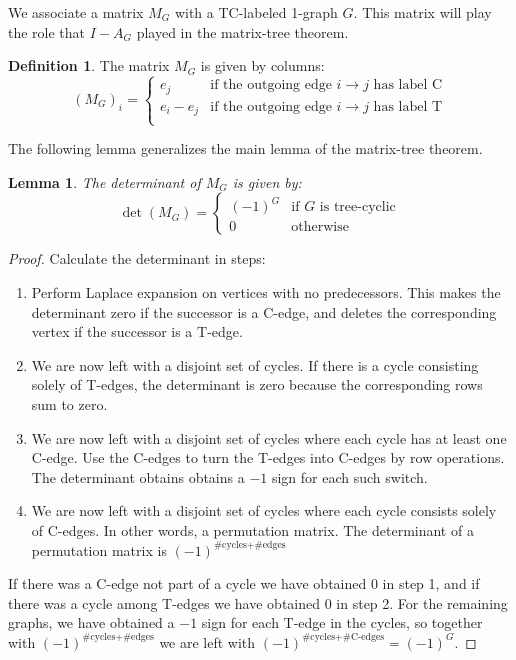 \documentclass[a4paper, 11pt]{article}
\newtheorem{lemma}[theorem]{Lemma}
\theoremstyle{definition}
\newtheorem{definition}{Definition}[section]
\begin{document}
We associate a matrix $M_G$ with a TC-labeled 1-graph $G$. This matrix will play the role that $I - A_G$ played in the matrix-tree theorem.

\begin{definition}
  The matrix $M_G$ is given by columns:
  \[
    (M_G)_i = \begin{cases}
      e_j & \text{if the outgoing edge $i \to j$ has label C} \\
      e_i - e_j & \text{if the outgoing edge $i \to j$ has label T} \\
    \end{cases}
  \]
\end{definition}

The following lemma generalizes the main lemma of the matrix-tree theorem.

\begin{lemma}
  The determinant of $M_G$ is given by:
  \[
    \det(M_G) = \begin{cases}
      (-1)^G & \text{if $G$ is tree-cyclic} \\
      0 & \text{otherwise}
    \end{cases}
  \]
\end{lemma}
\begin{proof}
  Calculate the determinant in steps:
  \begin{enumerate}
    \item Perform Laplace expansion on vertices with no predecessors. This makes the determinant zero if the successor is a C-edge, and deletes the corresponding vertex if the successor is a T-edge.
    \item We are now left with a disjoint set of cycles. If there is a cycle consisting solely of T-edges, the determinant is zero because the corresponding rows sum to zero.
    \item We are now left with a disjoint set of cycles where each cycle has at least one C-edge. Use the C-edges to turn the T-edges into C-edges by row operations. The determinant obtains obtains a $-1$ sign for each such switch.
    \item We are now left with a disjoint set of cycles where each cycle consists solely of C-edges. In other words, a permutation matrix. The determinant of a permutation matrix is $(-1)^{\text{\#cycles} + \text{\#edges}}$
  \end{enumerate}
  If there was a C-edge not part of a cycle we have obtained $0$ in step 1, and if there was a cycle among T-edges we have obtained $0$ in step 2. For the remaining graphs, we have obtained a $-1$ sign for each T-edge in the cycles, so together with $(-1)^{\text{\#cycles} + \text{\#edges}}$ we are left with $(-1)^{\text{\#cycles} + \text{\#C-edges}} = (-1)^G$.
\end{proof}
\end{document}
